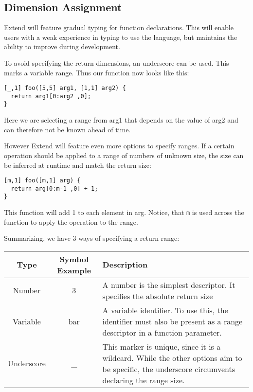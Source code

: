 \subsection{Dimension Assignment}
\par Extend will feature gradual typing for function declarations. This will enable users with a weak experience in typing to use the language, but maintains the ability to improve during development.
\par To avoid specifying the return dimensions, an underscore can be used. This marks a variable range. Thus our function now looks like this:
\begin{lstlisting}
[_,1] foo([5,5] arg1, [1,1] arg2) {
  return arg1[0:arg2 ,0];
}
\end{lstlisting}
Here we are selecting a range from arg1 that depends on the value of arg2 and can therefore not be known ahead of time.
\par However Extend will feature even more options to specify ranges. If a certain operation should be applied to a range of numbers of unknown size, the size can be inferred at runtime and match the return size:
\begin{lstlisting}
[m,1] foo([m,1] arg) {
  return arg[0:m-1 ,0] + 1;
}
\end{lstlisting}
This function will add 1 to each element in arg. Notice, that \texttt{m} is used across the function to apply the operation to the range.
\par Summarizing, we have 3 ways of specifying a return range:\newline
\begin{tabularx}{\columnwidth}{| c | c | X |} \hline
Type & Symbol Example & Description \\ \hline
Number & 3 & A number is the simplest descriptor. It specifies the absolute return size \\ \hline
Variable & bar & A variable identifier. To use this, the identifier must also be present as a range descriptor in a function parameter. \\ \hline
Underscore & \_ & This marker is unique, since it is a wildcard. While the other options aim to be specific, the underscore circumvents declaring the range size. \\ \hline
\end{tabularx}
